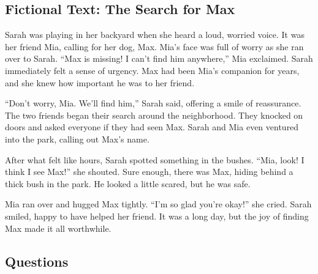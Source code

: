 \documentclass[12pt]{article}
\begin{document}
\onehalfspacing


\subsection*{Fictional Text: The Search for Max}

\begin{tcolorbox}[colframe=black!40, colback=gray!5]

\begin{spacing}{1.15}
    Sarah was playing in her backyard when she heard a loud, worried voice. It was her friend Mia, calling for her dog, Max. Mia’s face was full of worry as she ran over to Sarah. “Max is missing! I can’t find him anywhere,” Mia exclaimed. Sarah immediately felt a sense of urgency. Max had been Mia’s companion for years, and she knew how important he was to her friend. 

    “Don’t worry, Mia. We’ll find him,” Sarah said, offering a smile of reassurance. The two friends began their search around the neighborhood. They knocked on doors and asked everyone if they had seen Max. Sarah and Mia even ventured into the park, calling out Max’s name.

    After what felt like hours, Sarah spotted something in the bushes. “Mia, look! I think I see Max!” she shouted. Sure enough, there was Max, hiding behind a thick bush in the park. He looked a little scared, but he was safe. 

    Mia ran over and hugged Max tightly. “I’m so glad you’re okay!” she cried. Sarah smiled, happy to have helped her friend. It was a long day, but the joy of finding Max made it all worthwhile.

\end{spacing}

\end{tcolorbox}

\vspace{1cm}

\vspace{3.4cm}

\subsection*{Questions}
\end{document}
